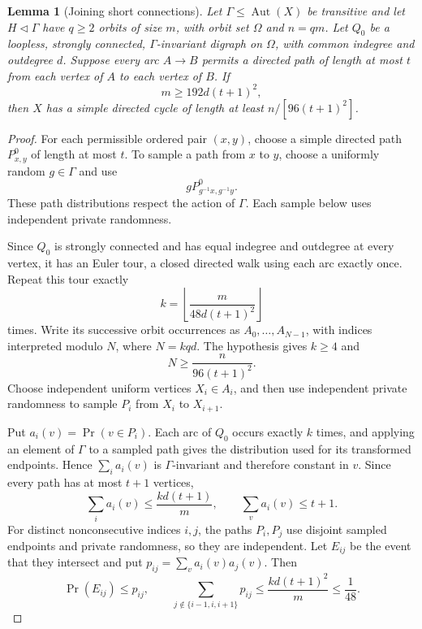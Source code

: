 \documentclass[11pt,a4paper,reqno]{amsart}
\newtheorem{lemma}[theorem]{Lemma}
\theoremstyle{definition}
\theoremstyle{remark}
\numberwithin{equation}{section}
\DeclareMathOperator{\Aut}{Aut}
\begin{document}
\begin{lemma}[Joining short connections]\label{lem:avoid-intersections}
Let $\Gamma\le\Aut(X)$ be transitive and let $H\lhd\Gamma$ have $q\ge2$ orbits of size $m$, with orbit set $\Omega$ and $n=qm$. Let $Q_0$ be a loopless, strongly connected, $\Gamma$-invariant digraph on $\Omega$, with common indegree and outdegree $d$. Suppose every arc $A\to B$ permits a directed path of length at most $t$ from each vertex of $A$ to each vertex of $B$. If
\begin{equation}\label{eq:samplinghypothesis}
 m\ge192d(t+1)^2,
\end{equation}
then $X$ has a simple directed cycle of length at least $n/[96(t+1)^2]$.
\end{lemma}
\begin{proof}
For each permissible ordered pair $(x,y)$, choose a simple directed path $P^0_{x,y}$ of length at most $t$. To sample a path from $x$ to $y$, choose a uniformly random $g\in\Gamma$ and use
\[
 gP^0_{g^{-1}x,g^{-1}y}.
\]
These path distributions respect the action of $\Gamma$. Each sample below uses independent private randomness.

Since $Q_0$ is strongly connected and has equal indegree and outdegree at every vertex, it has an Euler tour, a closed directed walk using each arc exactly once. Repeat this tour exactly
\[
 k=\left\lfloor\frac{m}{48d(t+1)^2}\right\rfloor
\]
times. Write its successive orbit occurrences as $A_0,\ldots,A_{N-1}$, with indices interpreted modulo $N$, where $N=kqd$. The hypothesis gives $k\ge4$ and
\begin{equation}\label{eq:Npaths}
 N\ge\frac{n}{96(t+1)^2}.
\end{equation}
Choose independent uniform vertices $X_i\in A_i$, and then use independent private randomness to sample $P_i$ from $X_i$ to $X_{i+1}$.

Put $a_i(v)=\Pr(v\in P_i)$. Each arc of $Q_0$ occurs exactly $k$ times, and applying an element of $\Gamma$ to a sampled path gives the distribution used for its transformed endpoints. Hence $\sum_i a_i(v)$ is $\Gamma$-invariant and therefore constant in $v$. Since every path has at most $t+1$ vertices,
\begin{equation}\label{eq:load}
 \sum_i a_i(v)\le\frac{kd(t+1)}m,
 \qquad \sum_v a_i(v)\le t+1.
\end{equation}
For distinct nonconsecutive indices $i,j$, the paths $P_i,P_j$ use disjoint sampled endpoints and private randomness, so they are independent. Let $E_{ij}$ be the event that they intersect and put $p_{ij}=\sum_v a_i(v)a_j(v)$. Then
\begin{equation}\label{eq:localload}
 \Pr(E_{ij})\le p_{ij},\qquad
 \sum_{j\notin\{i-1,i,i+1\}}p_{ij}
 \le\frac{kd(t+1)^2}{m}\le\frac1{48}.
\end{equation}


\end{proof}
\end{document}
